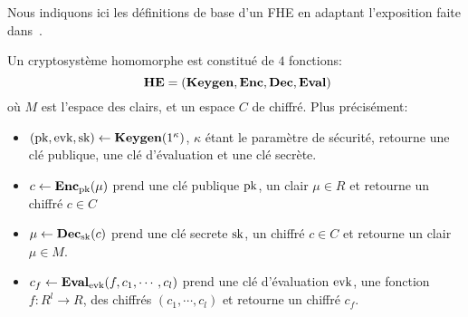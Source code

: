 

Nous indiquons ici les définitions de base d'un FHE en adaptant
l'exposition faite dans~\cite{halevi}.

\begin{definition}
Un cryptosystème homomorphe est constitué de $4$ fonctions:
\[ \text{\textbf{HE}} = (\Keygen, \Enc, \Dec, \Eval)\]
où $M$ est  l'espace des clairs, et un espace $C$ de chiffré. Plus précisément:
\begin{itemize}
\item $(\text{pk}, \text{evk}, \text{sk}) \leftarrow \text{\textbf{Keygen}}(1^\kappa)$, $\kappa$ étant le paramètre de sécurité, retourne une clé publique, une clé d'évaluation et une clé secrète.
\item $c \leftarrow \text{\textbf{Enc}}_{\text{pk}}(\mu)$ prend une clé publique $\text{pk}$, un clair $\mu \in R$ et retourne un chiffré $c\in C$
\item $\mu \leftarrow \text{\textbf{Dec}}_{\text{sk}}(c)$ prend une clé secrete $\text{sk}$, un chiffré $c \in C$ et retourne un clair $\mu \in M$.
\item $c_f \leftarrow \text{\textbf{Eval}}_{\text{evk}}(f, c_1,\cdots,c_l)$ prend une clé d'évaluation
$\text{evk}$, une fonction $f: R^l \rightarrow R$, des chiffrés $(c_1, \cdots, c_l)$ et retourne un chiffré $c_f$.
\end{itemize}
\end{definition}





